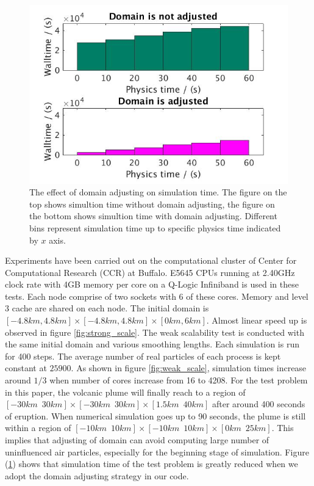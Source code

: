 \documentclass[10pt,a4paper]{article}
\begin{document}
\begin{figure}[!t]
\centering
\includegraphics[scale=0.35]{adj_vs_no}
\caption{The effect of domain adjusting on simulation time. The figure on the top shows simultion time without domain adjusting, the figure on the bottom shows simultion time with domain adjusting. Different bins represent simulation time up to specific physics time indicated by $x$ axis.}
\label{fig:adj_vs_no}
\end{figure}
Experiments have been carried out on the computational cluster of Center for Computational Research (CCR) at Buffalo. E5645 CPUs running at 2.40GHz clock rate with 4GB memory per core on a Q-Logic Infiniband is used in these tests. Each node comprise of two sockets with 6 of these cores. Memory and level 3 cache are shared on each node. 
The initial domain is $[-4.8km,4.8km]\times [-4.8km,4.8km] \times [0km, 6km]$. Almost linear speed up is observed in figure \ref{fig:strong_scale}.
The weak scalability test is conducted with the same initial domain and various smoothing lengths. Each simulation is run for 400 steps. The average number of real particles of each process is kept constant at $25900$. As shown in figure \ref{fig:weak_scale}, simulation times increase around $1/3$ when number of cores increase from 16 to 4208. For the test problem in this paper, the volcanic plume will finally reach to a region of $[-30km \,\,\, 30km] \times [-30km\,\,\,30km] \times [1.5km\,\,\,40km]$ after around 400 seconds of eruption. When numerical simulation goes up to 90 seconds, the plume is still within a region of $[-10km\,\,\,10km] \times [-10km\,\,\,10km] \times [0km\,\,\,25km]$. This implies that adjusting of domain can avoid computing large number of uninfluenced air particles, especially for the beginning stage of simulation. Figure (\ref{fig:adj_vs_no}) shows that simulation time of the test problem is greatly reduced when we adopt the domain adjusting strategy in our code. 
\end{document}
